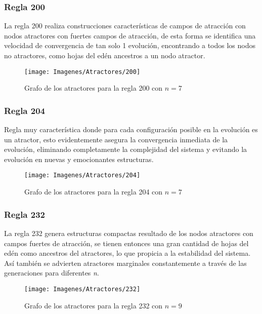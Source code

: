 \documentclass[]{article}
\begin{document}
			
			\newpage
			\subsubsection{Regla 200}
				\justifying
				La regla 200 realiza construcciones características de campos de atracción con nodos atractores con fuertes campos de atracción, de esta forma se identifica una velocidad de convergencia de tan solo 1 evolución, encontrando a todos los nodos no atractores, como hojas del edén ancestros a un nodo atractor.
				
				\hfill\break
				\hfill\break
				\begin{figure}[!h]
					\centering
					\texttt{[image: Imagenes/Atractores/200]}
					\caption{Grafo de los atractores para la regla 200 con $n=7$}
					\label{Regla_200}
				\end{figure}
			
			\newpage
			\subsubsection{Regla 204}
				\justifying
				Regla muy característica donde para cada configuración posible en la evolución es un atractor, esto evidentemente asegura la convergencia inmediata de la evolución, eliminando completamente la complejidad del sistema y evitando la evolución en nuevas y emocionantes estructuras.
				
				\hfill\break
				\hfill\break
				\begin{figure}[!h]
					\centering
					\texttt{[image: Imagenes/Atractores/204]}
					\caption{Grafo de los atractores para la regla 204 con $n=7$}
					\label{Regla_204}
				\end{figure}
				
			
			\newpage
			\subsubsection{Regla 232}
				\justifying
				La regla 232 genera estructuras compactas resultado de los nodos atractores con campos fuertes de atracción, se tienen entonces una gran cantidad de hojas del edén como ancestros del atractores, lo que propicia a la estabilidad del sistema. Así también se advierten atractores marginales constantemente a través de las generaciones para diferentes \textit{n}.
				
				\hfill\break
				\hfill\break
				\begin{figure}[!h]
					\centering
					\texttt{[image: Imagenes/Atractores/232]}
					\caption{Grafo de los atractores para la regla 232 con $n=9$}
					\label{Regla_232}
				\end{figure}
	\newpage
\end{document}
